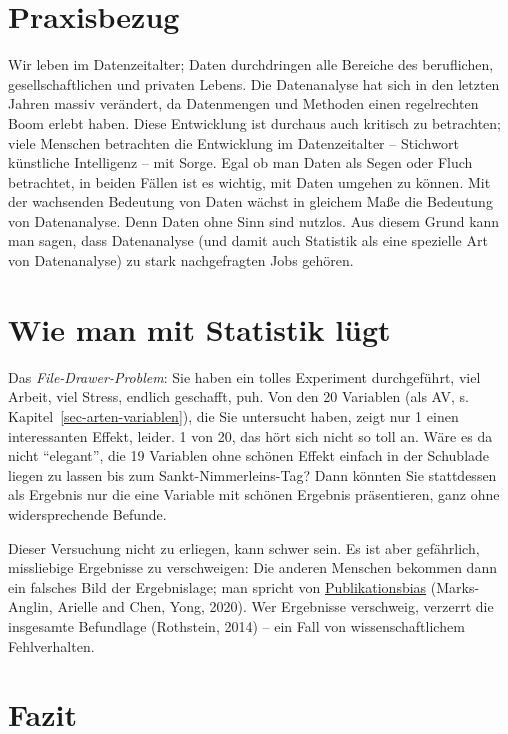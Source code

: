 \documentclass[
  letterpaper,
  oneside,
  open=any]{scrbook}
\theoremstyle{definition}
\theoremstyle{definition}
\theoremstyle{definition}
\theoremstyle{remark}
\begin{document}
\section{Praxisbezug}\label{praxisbezug}

Wir leben im Datenzeitalter; Daten durchdringen alle Bereiche des
beruflichen, gesellschaftlichen und privaten Lebens. Die Datenanalyse
hat sich in den letzten Jahren massiv verändert, da Datenmengen und
Methoden einen regelrechten Boom erlebt haben. Diese Entwicklung ist
durchaus auch kritisch zu betrachten; viele Menschen betrachten die
Entwicklung im Datenzeitalter -- Stichwort künstliche Intelligenz -- mit
Sorge. Egal ob man Daten als Segen oder Fluch betrachtet, in beiden
Fällen ist es wichtig, mit Daten umgehen zu können. Mit der wachsenden
Bedeutung von Daten wächst in gleichem Maße die Bedeutung von
Datenanalyse. Denn Daten ohne Sinn sind nutzlos. Aus diesem Grund kann
man sagen, dass Datenanalyse (und damit auch Statistik als eine
spezielle Art von Datenanalyse) zu stark nachgefragten Jobs gehören.

\section{Wie man mit Statistik
lügt}\label{wie-man-mit-statistik-luxfcgt}

Das \emph{File-Drawer-Problem}: Sie haben ein tolles Experiment
durchgeführt, viel Arbeit, viel Stress, endlich geschafft, puh. Von den
20 Variablen (als AV, s. Kapitel~\ref{sec-arten-variablen}), die Sie
untersucht haben, zeigt nur 1 einen interessanten Effekt, leider. 1 von
20, das hört sich nicht so toll an. Wäre es da nicht \enquote{elegant},
die 19 Variablen ohne schönen Effekt einfach in der Schublade liegen zu
lassen bis zum Sankt-Nimmerleins-Tag? Dann könnten Sie stattdessen als
Ergebnis nur die eine Variable mit schönen Ergebnis präsentieren, ganz
ohne widersprechende Befunde.

Dieser Versuchung nicht zu erliegen, kann schwer sein. Es ist aber
gefährlich, missliebige Ergebnisse zu verschweigen: Die anderen Menschen
bekommen dann ein falsches Bild der Ergebnislage; man spricht von
\href{https://de.wikipedia.org/wiki/Publikationsbias}{Publikationsbias}
(Marks-Anglin, Arielle and Chen, Yong, 2020). Wer Ergebnisse verschweig,
verzerrt die insgesamte Befundlage (Rothstein, 2014) -- ein Fall von
wissenschaftlichem Fehlverhalten.

\section{Fazit}\label{fazit-1}
\end{document}
